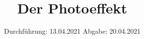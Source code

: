 

\subject{Versuch Nr.500}
\title{Der Photoeffekt}
\date{%
  Durchführung: 13.04.2021
  \hspace{3em}
  Abgabe: 20.04.2021
}



\maketitle
\thispagestyle{empty}
\tableofcontents
\newpage 






%

\nocite{*}

\printbibliography{}


